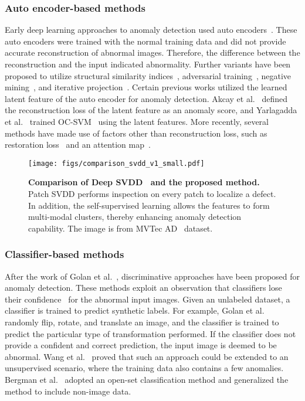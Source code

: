 \documentclass[runningheads]{llncs}
\begin{document}
\subsubsection{Auto encoder-based methods}
Early deep learning approaches to anomaly detection used auto encoders~\cite{vae_ad,recon_and_detect,ocgan}.
These auto encoders were trained with the normal training data and did not provide accurate reconstruction of abnormal images.
Therefore, the difference between the reconstruction and the input indicated abnormality.
Further variants have been proposed to utilize structural similarity indices~\cite{ssim_ae}, adversarial training~\cite{recon_and_detect}, negative mining~\cite{ocgan}, and iterative projection~\cite{iterative_project}.
Certain previous works utilized the learned latent feature of the auto encoder for anomaly detection.
Akcay et al.~\cite{ganomaly} defined the reconstruction loss of the latent feature as an anomaly score, and Yarlagadda et al.~\cite{satellite} trained OC-SVM~\cite{ocsvm} using the latent features.
More recently, several methods have made use of factors other than reconstruction loss, such as restoration loss~\cite{itae} and an attention map~\cite{ve_vae}.


\begin{figure}[t]
    \centering
    \texttt{[image: figs/comparison\_svdd\_v1\_small.pdf]}
    \vspace{-1.2em}
    \caption{\textbf{Comparison of Deep SVDD~\cite{deepSVDD} and the proposed method.} Patch SVDD performs inspection on every patch to localize a defect. In addition, the self-supervised learning allows the features to form multi-modal clusters, thereby enhancing anomaly detection capability. The image is from MVTec AD~\cite{mvtecad} dataset.}
    \label{fig:svdd_comparison}
    \vspace{-0.8em}
\end{figure} 

\subsubsection{Classifier-based methods} After the work of Golan et al.~\cite{geom}, discriminative approaches have been proposed for anomaly detection.
These methods exploit an observation that classifiers lose their confidence~\cite{oodbaseline} for the abnormal input images.
Given an unlabeled dataset, a classifier is trained to predict synthetic labels.
For example, Golan et al.~\cite{geom} randomly flip, rotate, and translate an image, and the classifier is trained to predict the particular type of transformation performed.
If the classifier does not provide a confident and correct prediction, the input image is deemed to be abnormal.
Wang et al.~\cite{e3outlier} proved that such an approach could be extended to an unsupervised scenario, where the training data also contains a few anomalies.
Bergman et al.~\cite{goad} adopted an open-set classification method and generalized the method to include non-image data.
\end{document}
